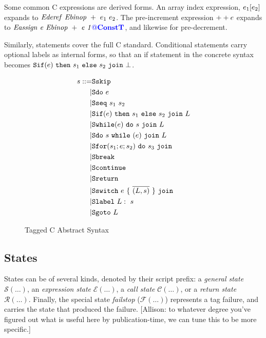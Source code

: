 \documentclass{llncs}
\begin{document}
Some common C expressions are derived forms. An array index expression,
\(e_1[e_2]\) expands to \(\mathit{Ederef} ~ \mathit{Ebinop} ~ + ~ e_1 ~ e_2\).
The pre-increment  expression \(++e\) expands to
\(\mathit{Eassign ~ e ~ \mathit{Ebinop} ~ + ~ e ~ 1{\color{blue} @}\color{blue} \mathbf{ConstT}}\), and likewise for pre-decrement.

Similarly, statements cover the full C standard. Conditional statements
carry optional labels as internal forms, so that an if statement in the
concrete syntax becomes \(\mathtt{Sif}(e) ~ \mathtt{then} ~ s_1 ~ \mathtt{else} ~ s_2 ~ \mathtt{join} ~ \bot\).

\begin{figure}
  \begin{subfigure}[t]{0.3\textwidth}
    \[\begin{aligned}
    s ::= & \mathtt{Sskip} \\
    | & \mathtt{Sdo} ~ e \\
    | & \mathtt{Sseq} ~ s_1 ~ s_2 \\
    | & \mathtt{Sif}(e) ~ \mathtt{then} ~ s_1 ~ \mathtt{else} ~ s_2 ~ \mathtt{join} ~ L \\
    | & \mathtt{Swhile}(e) ~ \mathtt{do} ~ s ~ \mathtt{join} ~ L \\
    | & \mathtt{Sdo} ~ s ~ \mathtt{while} ~ (e) ~ \mathtt{join} ~ L \\
    | & \mathtt{Sfor}(s_1; e; s_2) ~ \mathtt{do} ~ s_3 ~ \mathtt{join} ~ \\
    | & \mathtt{Sbreak} \\
    | & \mathtt{Scontinue} \\
    | & \mathtt{Sreturn} ~ \\
    | & \mathtt{Sswitch} ~ e ~ \{ ~ \overline{(L,s)} ~ \} ~ \mathtt{join} ~ \\
    | & \mathtt{Slabel} ~ L: ~ s \\
    | & \mathtt{Sgoto} ~ L \\    
    \end{aligned}\]
  \end{subfigure}
  \begin{subfigure}[t]{0.69\textwidth}
  \end{subfigure}
  \caption{Tagged C Abstract Syntax}
  \label{fig:syntax}
\end{figure}

\subsection{States}

States can be of several kinds, denoted by their script prefix: a {\em general state} \(\mathcal{S}(\dots)\),
an {\em expression state} \(\mathcal{E}(\dots)\), a {\em call state} \(\mathcal{C}(\dots)\), or a
{\em return state} \(\mathcal{R}(\dots)\). Finally, the special state {\em failstop} (\(\mathcal{F}(\dots)\))
represents a tag failure, and carries the state that produced the failure.
[Allison: to whatever degree you've figured out what is useful here by publication-time, we can
  tune this to be more specific.]
\end{document}
